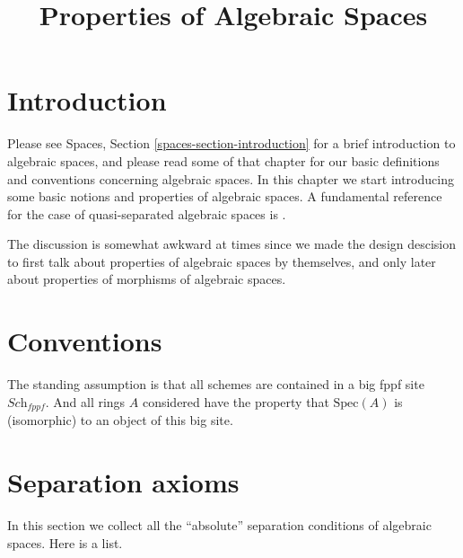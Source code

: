 

%


\title{Properties of Algebraic Spaces}


\maketitle

\label{section-phantom}

\tableofcontents

\section{Introduction}
\label{section-introduction}

\noindent
Please see Spaces, Section \ref{spaces-section-introduction}
for a brief introduction to algebraic spaces, and please read
some of that chapter for our basic definitions and conventions
concerning algebraic spaces. In this chapter we start introducing
some basic notions and properties of algebraic spaces. A fundamental
reference for the case of quasi-separated algebraic spaces is
\cite{Kn}.

\medskip\noindent
The discussion is somewhat awkward at times since we made the design
descision to first talk about properties of algebraic spaces by
themselves, and only later about properties of morphisms of algebraic
spaces.



\section{Conventions}
\label{section-conventions}

\noindent
The standing assumption is that all schemes are contained in
a big fppf site $\textit{Sch}_{fppf}$. And all rings $A$ considered
have the property that $\text{Spec}(A)$ is (isomorphic) to an
object of this big site.


\section{Separation axioms}
\label{section-separation}

\noindent
In this section we collect all the ``absolute'' separation conditions
of algebraic spaces. Here is a list.

